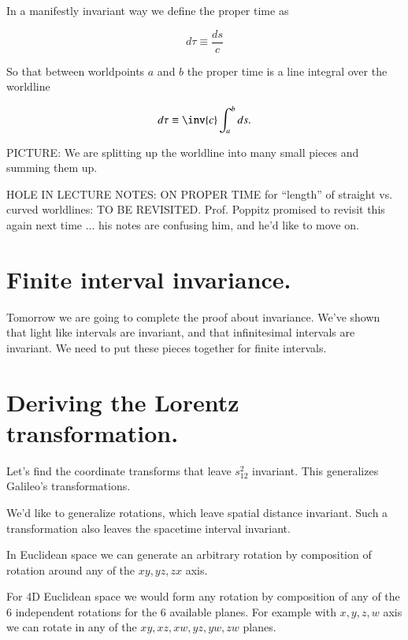 In a manifestly invariant way we define the proper time as 

\begin{equation}\label{eqn:relativisticElectrodynamicsL4:20}
d\tau \equiv \frac{ds}{c}
\end{equation}

So that between worldpoints $a$ and $b$ the proper time is a line integral over the worldline

\begin{equation}\label{eqn:relativisticElectrodynamicsL4:30}
d\tau \equiv \inv{c} \int_a^b ds.
\end{equation}

PICTURE: We are splitting up the worldline into many small pieces and summing them up.

HOLE IN LECTURE NOTES: ON PROPER TIME for ``length'' of straight vs. curved worldlines: TO BE REVISITED.  Prof. Poppitz promised to revisit this again next time ... his notes are confusing him, and he'd like to move on.

\section{Finite interval invariance.}

Tomorrow we are going to complete the proof about invariance.  We've shown that light like intervals are invariant, and that infinitesimal intervals are invariant.  We need to put these pieces together for finite intervals.

\section{Deriving the Lorentz transformation.}

Let's find the coordinate transforms that leave $s_{12}^2$ invariant.  This generalizes Galileo's transformations.

We'd like to generalize rotations, which leave spatial distance invariant.  Such a transformation also leaves the spacetime interval invariant.

In Euclidean space we can generate an arbitrary rotation by composition of rotation around any of the $xy, yz, zx$ axis.

For 4D Euclidean space we would form any rotation by composition of any of the 6 independent rotations for the 6 available planes.  For example with $x,y,z,w$ axis we can rotate in any of the $xy, xz, xw, yz, yw, zw$ planes.


